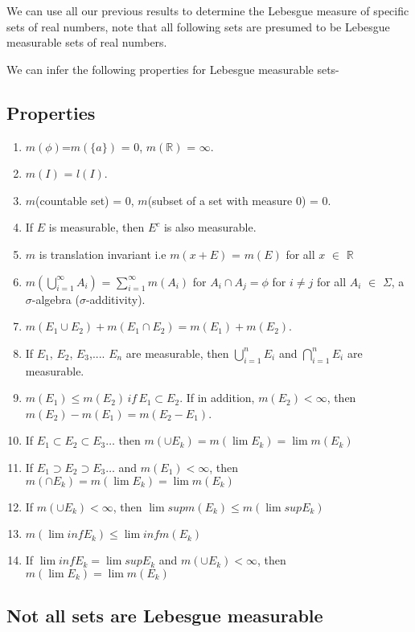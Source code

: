 \documentclass{article}
\begin{document}
We can use all our previous results to determine the Lebesgue measure of specific sets of real numbers, note that all following sets are presumed to be Lebesgue measurable sets of real numbers.

We can infer the following properties for Lebesgue measurable sets-

\subsection{Properties}
\begin{enumerate}
    \item $m(\phi)$=$m(\{a\})$ = 0, $m(\mathbb{R})$ = $\infty$.
    \item $m(I)$ = $l(I)$.
    \item $m$(countable set) = 0, $m$(subset of a set with measure 0) = 0.
    \item If $E$ is measurable, then $E^c$ is also measurable.
    \item $m$ is translation invariant i.e $m(x + E)$ = $m(E)$ for all $x$ $\in$ $\mathbb{R}$
    \item $m(\bigcup \limits_{i=1}^\infty A_i)$ = $\sum \limits_{i=1}^\infty m(A_i)$ for $A_i \cap A_j = \phi$ for $i \neq j$ for all $A_i$ $\in$ $\Sigma$, a $\sigma$-algebra ($\sigma$-additivity).
    \item $m(E_1 \cup E_2) + m(E_1 \cap E_2) = m(E_1)+ m(E_2)$.
    \item If $E_1$, $E_2$, $E_3$,.... $E_n$ are measurable, then $\bigcup\limits_{i=1}^{n}E_i$ and $\bigcap\limits_{i=1}^{n}E_i$ are measurable.
    \item $m(E_1) \leq m(E_2)\, if \, E_1 \subset E_2$. If in addition, $m(E_2) <\infty$, then $m(E_2)-m(E_1)=m(E_2-E_1)$.
    \item If $E_1 \subset E_2 \subset E_3 \dots$ then $m(\cup E_k)=m(\lim E_k)=\lim m(E_k)$
    \item If $E_1 \supset E_2 \supset E_3 \dots$ and $m(E_1) < \infty $, then $m(\cap     E_k)=m(\lim E_k)=\lim m(E_k)$
    \item If $m(\cup E_k) < \infty$, then $\lim sup m(E_k) \leq m(\lim sup E_k)$
    \item  $ m(\lim inf E_k) \leq \lim inf m(E_k) $
    \item If $\lim inf E_k = \lim sup E_k$ and $m(\cup E_k)<\infty$, then $m(\lim E_k)=\lim m(E_k)$
\end{enumerate}


\subsection{Not all sets are Lebesgue measurable}
\end{document}
